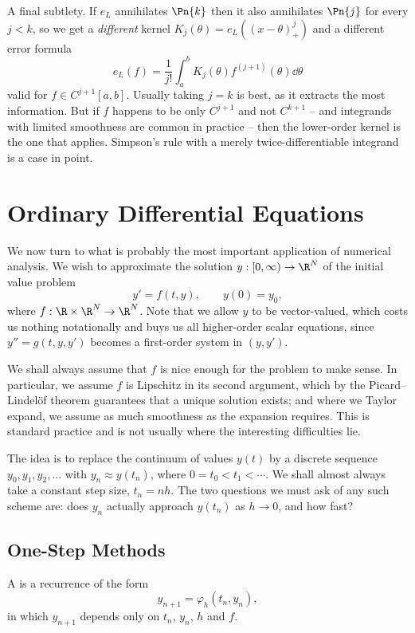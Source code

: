 \begin{remark}
  A final subtlety. If $e_L$ annihilates $\Pn{k}$ then it also annihilates $\Pn{j}$ for every $j < k$, so we get a \emph{different} kernel $K_j(\theta) = e_L((x-\theta)_+^j)$ and a different error formula
  $$
  e_L(f) = \frac{1}{j!}\int_a^b K_j(\theta)f^{(j+1)}(\theta)\dd\theta
  $$
  valid for $f \in C^{j+1}[a,b]$. Usually taking $j = k$ is best, as it extracts the most information. But if $f$ happens to be only $C^{j+1}$ and not $C^{k+1}$ -- and integrands with limited smoothness are common in practice -- then the lower-order kernel is the one that applies. Simpson's rule with a merely twice-differentiable integrand is a case in point.
\end{remark}


\section{Ordinary Differential Equations}

We now turn to what is probably the most important application of numerical analysis. We wish to approximate the solution $y: [0, \infty) \to \R^N$ of the initial value problem
$$
y' = f(t, y), \qquad y(0) = y_0,
$$
where $f: \R \times \R^N \to \R^N$. Note that we allow $y$ to be vector-valued, which costs us nothing notationally and buys us all higher-order scalar equations, since $y'' = g(t,y,y')$ becomes a first-order system in $(y, y')$.

We shall always assume that $f$ is nice enough for the problem to make sense. In particular, we assume $f$ is Lipschitz in its second argument, which by the Picard--Lindelöf theorem guarantees that a unique solution exists; and where we Taylor expand, we assume as much smoothness as the expansion requires. This is standard practice and is not usually where the interesting difficulties lie.

The idea is to replace the continuum of values $y(t)$ by a discrete sequence $y_0, y_1, y_2, \dots$ with $y_n \approx y(t_n)$, where $0 = t_0 < t_1 < \cdots$. We shall almost always take a constant step size, $t_n = nh$. The two questions we must ask of any such scheme are: does $y_n$ actually approach $y(t_n)$ as $h \to 0$, and how fast?

\subsection{One-Step Methods}

\begin{definition}
  A  is a recurrence of the form
  $$
  y_{n+1} = \varphi_h(t_n, y_n),
  $$
  in which $y_{n+1}$ depends only on $t_n$, $y_n$, $h$ and $f$.
\end{definition}

